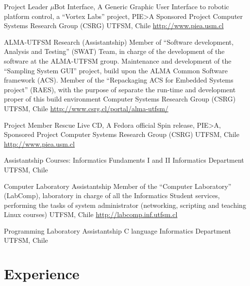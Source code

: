 \documentclass[12pt,a4paper]{moderncv}
\newcommand{\gray}{\textcolor{gray}}
\newcommand{\myurl}[1]{\gray{\url{#1}}}
\begin{document}
        {Project Leader}
        {$\mu$Bot Interface, A Generic Graphic User Interface to robotic platform
        control, a ``Vortex Labs'' project, PIE>A Sponsored Project}
        {Computer Systems Research Group (CSRG)}
        {UTFSM, Chile}
        {\myurl{http://www.piea.usm.cl}}

        {ALMA-UTFSM Research (Assistantship)}
        {Member of ``Software development, Analysis and Testing'' (SWAT) Team,
        in charge of the development of the software at the ALMA-UTFSM group.
        Maintenance and development of the ``Sampling System GUI'' project,
        build upon the ALMA Common Software framework (ACS).
        Member of the ``Repackaging ACS for Embedded Systems project'' (RAES),
        with the purpose of separate the run-time and development
        proper of this build environment}
        {Computer Systems Research Group (CSRG)}
        {UTFSM, Chile}
        {\myurl{http://www.csrg.cl/portal/alma-utfsm/}}

        {Project Member}
        {Rescue Live CD, A Fedora official Spin release,
         PIE>A, Sponsored Project}
        {Computer Systems Research Group (CSRG)}
        {UTFSM, Chile}
        {\myurl{http://www.piea.usm.cl}}

        {Assistantship}
        {Courses: Informatics Fundaments  I and II}
        {Informatics Department}
        {UTFSM, Chile}
        {}

        {Computer Laboratory Assistantship}
        {Member of the ``Computer Laboratory'' (LabComp),
         laboratory in charge of all the Informatics Student services,
         performing the tasks of system administrator (networking, scripting and
         teaching Linux courses)}
        {UTFSM, Chile}
        {\myurl{http://labcomp.inf.utfsm.cl}}{}

        {Programming Laboratory Assistantship}
        {C language}
        {Informatics Department}
        {UTFSM, Chile}
        {}

\section{\LARGE Experience}
\end{document}
